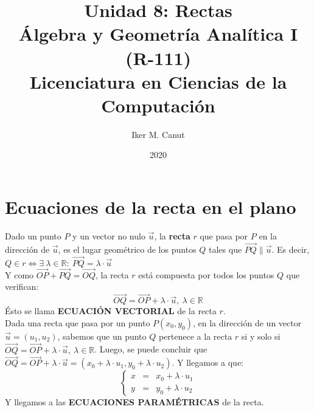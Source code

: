 \documentclass[11pt,a4paper]{article}
\author{Iker M. Canut}
\title{Unidad 8: Rectas\\\'Algebra y Geometr\'ia Anal\'itica I (R-111)\\Licenciatura en Ciencias de la Computaci\'on}
\date{2020}
\begin{document}
\maketitle
\newpage

\section{Ecuaciones de la recta en el plano}
Dado un punto $P$ y un vector no nulo $\overrightarrow{u}$, la \textbf{recta} $r$ que pasa por $P$ en la direcci\'on de $\overrightarrow{u}$, es el lugar geom\'etrico de los puntos $Q$ tales que $\overrightarrow{PQ} \parallel \overrightarrow{u}$. Es decir, $Q \in r \iff \exists\ \lambda \in \mathbb{R} :\ \overrightarrow{PQ} = \lambda \cdot \overrightarrow{u}$\\
\noindent Y como $\overrightarrow{OP} + \overrightarrow{PQ} = \overrightarrow{OQ}$, la recta $r$ est\'a compuesta por todos los puntos $Q$ que verifican: 
\begin{equation}
\overrightarrow{OQ} = \overrightarrow{OP} + \lambda \cdot \overrightarrow{u},\ \lambda \in \mathbb{R}
\end{equation}
\'Esto se llama \textbf{ECUACI\'ON VECTORIAL} de la recta $r$.\\

Dada una recta que pasa por un punto $P(x_0, y_0)$, en la direcci\'on de un vector $\overrightarrow{u}=(u_1,u_2)$, sabemos que un punto $Q$ pertenece a la recta $r$ si y solo si $\overrightarrow{OQ} = \overrightarrow{OP} + \lambda \cdot \overrightarrow{u},\ \lambda \in \mathbb{R}$. Luego, se puede concluir que $\overrightarrow{OQ} = \overrightarrow{OP} + \lambda \cdot \overrightarrow{u} = (x_0 + \lambda \cdot u_1, y_0+\lambda\cdot u_2)$. Y llegamos a que:
\begin{equation}
\left\{\begin{array}{lll}
x & = & x_0 + \lambda \cdot u_1\\
y & = & y_0 + \lambda \cdot u_2
\end{array}\right.
\end{equation}
Y llegamos a las \textbf{ECUACIONES PARAM\'ETRICAS} de la recta.\\
\end{document}
